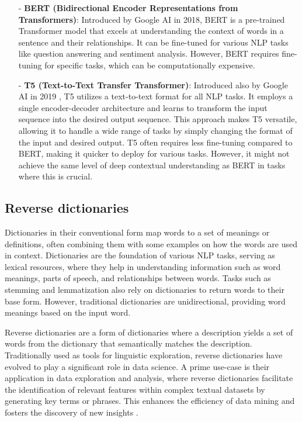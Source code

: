 \documentclass[12pt]{article}
\begin{document}
\begin{enumerate}
    \item[-] \textbf{BERT (Bidirectional Encoder Representations from Transformers)}: Introduced by Google AI \cite{devlin2018} in 2018, BERT is a pre-trained Transformer model that excels at understanding the context of words in a sentence and their relationships. It can be fine-tuned for various NLP tasks like question answering and sentiment analysis. However, BERT requires fine-tuning for specific tasks, which can be computationally expensive.
    \item[-] \textbf{T5 (Text-to-Text Transfer Transformer)}: Introduced also by Google AI in 2019 \cite{Raffel2019}, T5 utilizes a text-to-text format for all NLP tasks. It employs a single encoder-decoder architecture and learns to transform the input sequence into the desired output sequence. This approach makes T5 versatile, allowing it to handle a wide range of tasks by simply changing the format of the input and desired output. T5 often requires less fine-tuning compared to BERT, making it quicker to deploy for various tasks. However, it might not achieve the same level of deep contextual understanding as BERT in tasks where this is crucial.
\end{enumerate}

\subsection{Reverse dictionaries}

Dictionaries in their conventional form map words to a set of meanings or definitions, often combining them with some examples on how the words are used in context. Dictionaries are the foundation of various NLP tasks, serving as lexical resources, where they help in understanding information such as word meanings, parts of speech, and relationships between words. Tasks such as stemming and lemmatization also rely on dictionaries to return words to their base form. However, traditional dictionaries are unidirectional, providing word meanings based on the input word.

Reverse dictionaries are a form of dictionaries where a description yields a set of words from the dictionary that semantically matches the description. Traditionally used as tools for linguistic exploration, reverse dictionaries have evolved to play a significant role in data science. A prime use-case is their application in data exploration and analysis, where reverse dictionaries facilitate the identification of relevant features within complex textual datasets by generating key terms or phrases. This enhances the efficiency of data mining and fosters the discovery of new insights \cite{Chen2022}.
\end{document}
